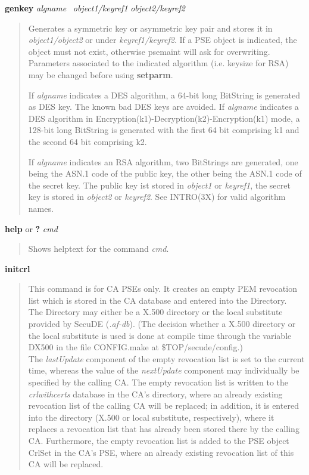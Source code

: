 {\bf genkey} {\em algname}~ {\em object1/keyref1} {\em object2/keyref2} 
\begin{quote}
Generates a symmetric key or asymmetric key pair and stores it in {\em object1/object2} or 
under {\em keyref1/keyref2}. 
If a PSE object is indicated, the object must not exist, otherwise psemaint will ask for overwriting. 
Parameters associated to the indicated algorithm (i.e. keysize for RSA) may
be changed before using {\bf setparm}. 
 
If {\em algname} indicates a DES algorithm, a 64-bit long BitString is generated as DES key. The
known bad DES keys are avoided. If {\em algname} indicates a DES algorithm in 
Encryption(k1)-Decryption(k2)-Encryption(k1) mode, a 128-bit long BitString is generated with
the first 64 bit comprising k1 and the second 64 bit comprising k2.
 
If {\em algname} indicates an RSA algorithm, two BitStrings are generated, one being
the ASN.1 code of the public key, the other being the ASN.1 code of the secret key.
The public key ist stored in {\em object1} or {\em keyref1}, the secret key is stored in
{\em object2} or {\em keyref2}.
See INTRO(3X) for valid algorithm names.
\end{quote}

{\bf help} or {\bf ?} {\em cmd}
\begin{quote}
Shows helptext for the command {\em cmd}.
\end{quote}

{\bf initcrl} 
\begin{quote}
This command is for CA PSEs only.
It creates an empty PEM revocation list which is stored in the CA database and entered into the Directory. \\
The Directory may either be a X.500 directory or the local substitute provided by 
SecuDE ({\em .af-db}). (The decision whether a X.500 directory or the local substitute 
is used is done at compile time through the variable DX500 in the file CONFIG.make
at \$TOP/secude/config.) \\
The {\em lastUpdate} component of the empty revocation list is set to the current time, whereas the value 
of the {\em nextUpdate} component may individually be specified by the calling CA. The empty
revocation list is written to the {\em crlwithcerts} database in the CA's directory, where an already
existing revocation list of the calling CA will be replaced; in addition, 
it is entered into the directory (X.500 or local substitute, respectively), where it replaces
a revocation list that has already been stored there by the calling CA. 
Furthermore, the empty revocation list is added to the PSE object CrlSet in the CA's PSE, where an
already existing revocation list of this CA will be replaced.
\end{quote}

